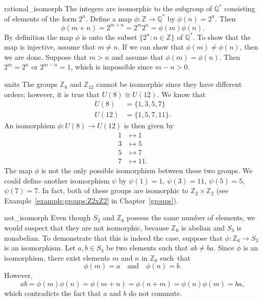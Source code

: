 \begin{example}{rational_isomorph}
The integers are isomorphic to the subgroup of ${\mathbb Q}^\ast$ consisting of elements of the form $2^n$.  Define a map $\phi: {\mathbb Z} \rightarrow {\mathbb Q}^\ast$ by $\phi( n ) = 2^n$. Then
\[
\phi( m + n ) = 2^{m + n} = 2^m 2^n = \phi( m ) \phi( n ).
\]
By definition the map $\phi$ is onto the subset $\{2^n :n \in {\mathbb Z} \}$ of  ${\mathbb Q}^\ast$.  To show that the map is injective, assume that $m \neq n$.  If we can show that $\phi(m) \neq \phi(n)$, then we are done.  Suppose that $m>n$ and assume that $\phi(m) = \phi(n)$.  Then $2^m = 2^n$ or $2^{m-n} = 1$, which is impossible since $m-n>0$. 
\end{example}

\begin{example}{units}
The groups ${\mathbb Z}_8$ and ${\mathbb Z}_{12}$  cannot be isomorphic since they have different orders; however, it is true that $U(8) \cong U(12)$.  We know that
\begin{align*}
U(8) & = \{1, 3, 5, 7 \} \\
U(12) & = \{1, 5, 7, 11 \}.
\end{align*}
An isomorphism $\phi : U(8) \rightarrow U(12)$ is then given by
\begin{align*}
1 & \mapsto  1 \\
3 & \mapsto  5 \\
5 & \mapsto  7 \\
7 & \mapsto  11.
\end{align*}
The map $\phi$ is not the only possible isomorphism between these two groups.  We could define another isomorphism $\psi$ by $\psi(1) = 1$, $\psi(3) = 11$, $\psi(5) = 5$, $\psi(7) = 7$. In fact, both of these groups are isomorphic to ${\mathbb Z}_2 \times {\mathbb Z}_2$ (see Example~\ref{example:groups:Z2xZ2} in Chapter~\ref{groups}). 
\end{example}

\begin{example}{not_isomorph}
Even though $S_3$ and ${\mathbb Z}_6$ possess the same number of elements, we would suspect that they are not isomorphic, because ${\mathbb Z}_6$ is abelian and $S_3$ is nonabelian.  To demonstrate that this is indeed the case, suppose that $\phi : {\mathbb Z}_6 \rightarrow  S_3$ is an isomorphism.  Let $a , b \in S_3$ be two elements such that $ab \neq ba$.  Since $\phi$ is an isomorphism, there exist elements $m$ and $n$ in ${\mathbb Z}_6$ such~that 
\[
\phi( m )  = a \quad \text{and} \quad
\phi( n )  = b.
\]
However,
\[
ab = \phi(m ) \phi(n) = \phi(m + n) = \phi(n + m) = \phi(n )
\phi(m) = ba,
\]
which contradicts the fact that $a$ and $b$ do not commute.
\end{example}

